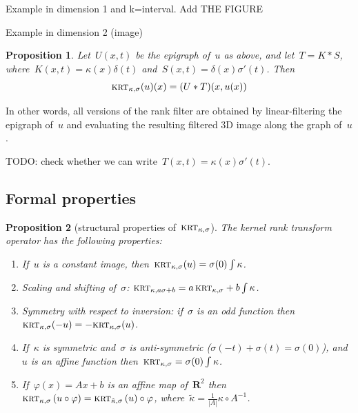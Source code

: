 \documentclass[12pt]{article}                  %
\newtheorem{proposition}{Proposition}
\begin{document}
Example in dimension 1 and k=interval.  Add THE FIGURE

Example in dimension 2 (image)

\begin{proposition}
Let~$U(x,t)$ be the epigraph of~$u$ as above, and let~$T=K*S$,
where~$K(x,t)=\kappa(x)\delta(t)$ and~$S(x,t)=\delta(x)\sigma'(t)$.  Then
\[
	\textsc{krt}_{\kappa,\sigma}(u)(x) = (U*T)(x,u(x))
\]
\end{proposition}
In other words, all versions of the rank filter are obtained by
linear-filtering the epigraph of~$u$ and evaluating the resulting filtered
3D image along the graph of~$u$.

TODO: check whether we can write~$T(x,t)=\kappa(x)\sigma'(t)$.

\subsection{Formal properties}


\begin{proposition}[structural properties of~$\textsc{krt}_{\kappa,\sigma}$]
	The kernel rank transform operator has the following properties:
	\begin{enumerate}
		\item[\bf P1] If~$u$ is a constant image,
			then~$\textsc{krt}_{\kappa,\sigma}(u)=\sigma(0)\int\kappa$.
		\item[\bf P2] Scaling and shifting of~$\sigma$:
			$\textsc{krt}_{\kappa,a\sigma+b}=a\,\textsc{krt}_{\kappa,\sigma}+b\int\kappa$.
		\item[\bf P3] Symmetry with respect to inversion: if~$\sigma$
			is an odd function
			then~$\textsc{krt}_{\kappa,\sigma}(-u)=-\textsc{krt}_{\kappa,\sigma}(u)$.
		\item[\bf P4] If~$\kappa$ is symmetric and~$\sigma$ is
			anti-symmetric ($\sigma(-t)+\sigma(t)=\sigma(0)$),
			and~$u$ is an affine function
			then~$\textsc{krt}_{\kappa,\sigma}=\sigma(0)\int\kappa$.
		\item[\bf P5] If~$\varphi(x)=Ax+b$ is an affine map
			of~$\mathbf{R}^2$
			then\\
			$\displaystyle
			\textsc{krt}_{\kappa,\sigma}\left(u\circ\varphi\right) =
			\textsc{krt}_{\tilde\kappa,\sigma}\left(u\right)\circ\varphi$,
			where~$\tilde\kappa=\frac1{|A|}\kappa\circ A^{-1}$.
	\end{enumerate}
\end{proposition}
\end{document}
